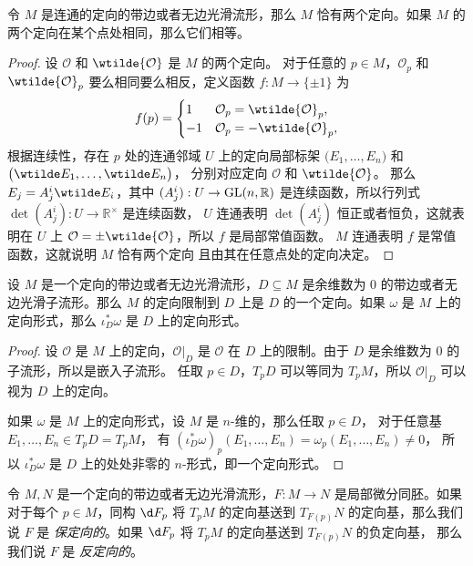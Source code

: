 \begin{proposition}
  令 $M$ 是连通的定向的带边或者无边光滑流形，那么 $M$ 恰有两个定向。如果 $M$
  的两个定向在某个点处相同，那么它们相等。
\end{proposition}
\begin{proof}
  设 $\mathcal{O}$ 和 $\wtilde{\mathcal{O}}$ 是 $M$ 的两个定向。
  对于任意的 $p\in M$，$\mathcal{O}_p$ 和 $\wtilde{\mathcal{O}}_p$
  要么相同要么相反，定义函数 $f:M\to \{\pm 1\}$ 为
  \[
    f(p)=\begin{cases}
      1 & \mathcal{O}_p=\wtilde{\mathcal{O}}_p,\\
      -1 & \mathcal{O}_p=-\wtilde{\mathcal{O}}_p,
    \end{cases}
  \]
  根据连续性，存在 $p$ 处的连通邻域 $U$ 上的定向局部标架
  $\bigl(E_1,\dots,E_n\bigr)$ 和 $\bigl(\wtilde E_1,\dots,\wtilde E_n\bigr)$，
  分别对应定向 $\mathcal{O}$ 和 $\wtilde{\mathcal{O}}$。
  那么 $E_j=A_j^i\wtilde E_i$，其中 $(A_j^i):U\to \operatorname{GL}(n,\mathbb{R})$
  是连续函数，所以行列式 $\det(A_j^i):U\to \mathbb{R}^\times$ 是连续函数，
  $U$ 连通表明 $\det(A^i_j)$ 恒正或者恒负，这就表明在 
  $U$ 上 $\mathcal{O}=\pm\wtilde{\mathcal{O}}$，所以 $f$ 是局部常值函数。
  $M$ 连通表明 $f$ 是常值函数，这就说明 $M$ 恰有两个定向
  且由其在任意点处的定向决定。
\end{proof}

\begin{proposition}
  设 $M$ 是一个定向的带边或者无边光滑流形，$D\subseteq M$
  是余维数为 $0$ 的带边或者无边光滑子流形。那么 $M$ 的定向限制到
  $D$ 上是 $D$ 的一个定向。如果 $\omega$ 是 $M$ 上的定向形式，那么
  $\iota_D^*\omega$ 是 $D$ 上的定向形式。
\end{proposition}
\begin{proof}
  设 $\mathcal{O}$ 是 $M$ 上的定向，$\mathcal{O}|_D$ 是 $\mathcal{O}$
  在 $D$ 上的限制。由于 $D$ 是余维数为 $0$ 的子流形，所以是嵌入子流形。
  任取 $p\in D$，$T_pD$ 可以等同为 $T_pM$，所以 $\mathcal{O}|_D$
  可以视为 $D$ 上的定向。

  如果 $\omega$ 是 $M$ 上的定向形式，设 $M$ 是 $n$-维的，那么任取 $p\in D$，
  对于任意基 $E_1,\dots,E_n\in T_pD=T_pM$，
  有 $(\iota_D^*\omega)_p(E_1,\dots,E_n)=\omega_p(E_1,\dots,E_n)\neq 0$，
  所以 $\iota_D^*\omega$ 是 $D$ 上的处处非零的 $n$-形式，即一个定向形式。
\end{proof}

令 $M,N$ 是一个定向的带边或者无边光滑流形，$F:M\to N$
是局部微分同胚。如果对于每个 $p\in M$，同构 $\d F_p$
将 $T_pM$ 的定向基送到 $T_{F(p)}N$ 的定向基，那么我们说 $F$
是 \emph{保定向的}。如果 $\d F_p$ 将 $T_pM$ 的定向基送到 $T_{F(p)}N$ 的负定向基，
那么我们说 $F$ 是 \emph{反定向的}。

